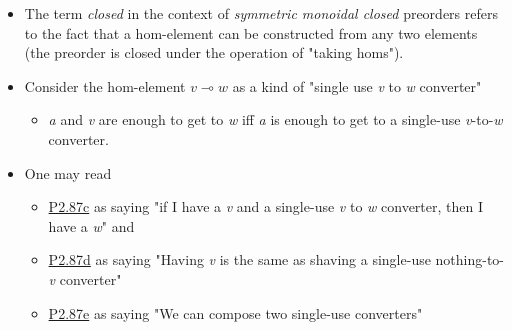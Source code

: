 \begin{itemize}
    \item  The term \emph{closed} in the context of \emph{symmetric monoidal closed} preorders refers to the fact that a hom-element can be constructed from any two elements (the preorder is closed under the operation of "taking homs").
    \item Consider the hom-element $v \multimap w$ as a kind of "single use \emph{v} to \emph{w} converter"
          \begin{itemize}
            \item \emph{a} and \emph{v} are enough to get to \emph{w} iff \emph{a} is enough to get to a single-use \emph{v}-to-\emph{w} converter.
          \end{itemize}
    \item One may read
          \begin{itemize}
            \item \href{doc/1 math/Seven Sketches in Compositionality/Chapter 2: Resource theories/5 Computing presented V-categories with matrix mult/1 Monoidal closed preorders/5 SMP currying}{P2.87c} as saying "if I have a \emph{v} and a single-use \emph{v} to \emph{w} converter, then I have a \emph{w}" and
            \item \href{doc/1 math/Seven Sketches in Compositionality/Chapter 2: Resource theories/5 Computing presented V-categories with matrix mult/1 Monoidal closed preorders/5 SMP currying}{P2.87d} as saying "Having \emph{v} is the same as shaving a single-use nothing-to-\emph{v} converter"
            \item \href{doc/1 math/Seven Sketches in Compositionality/Chapter 2: Resource theories/5 Computing presented V-categories with matrix mult/1 Monoidal closed preorders/5 SMP currying}{P2.87e} as saying "We can compose two single-use converters"
          \end{itemize}
  \end{itemize}
